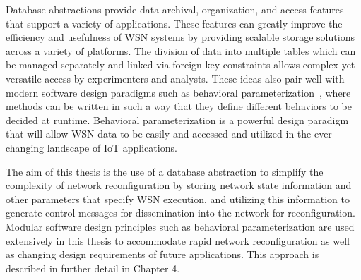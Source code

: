 Database abstractions provide data archival, organization, and access features that support a variety of applications. These features can greatly improve the efficiency and usefulness of WSN systems by providing scalable storage solutions across a variety of platforms. The division of data into multiple tables which can be managed separately and linked via foreign key constraints allows complex yet versatile access by experimenters and analysts. These ideas also pair well with modern software design paradigms such as behavioral parameterization~\cite{urma2014java}, where methods can be written in such a way that they define different behaviors to be decided at runtime. Behavioral parameterization is a powerful design paradigm that will allow WSN data to be easily and accessed and utilized in the ever-changing landscape of IoT applications.

The aim of this thesis is the use of a database abstraction to simplify the complexity of network reconfiguration by storing network state information and other parameters that specify WSN execution, and utilizing this information to generate control messages for dissemination into the network for reconfiguration. Modular software design principles such as behavioral parameterization are used extensively in this thesis to accommodate rapid network reconfiguration as well as changing design requirements of future applications. This approach is described in further detail in Chapter 4.